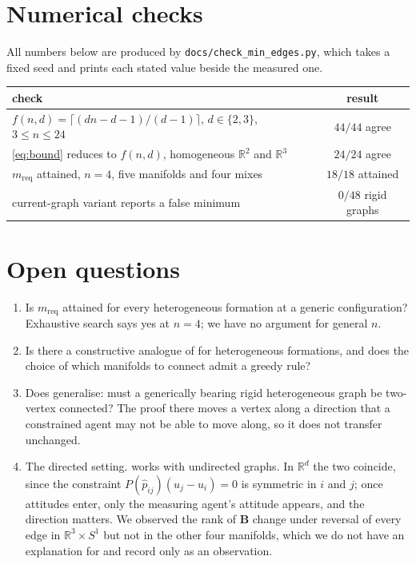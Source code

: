 \documentclass[11pt,a4paper]{article}
\theoremstyle{plain}
\theoremstyle{definition}
\newcommand{\R}{\mathbb{R}}
\begin{document}
\section{Numerical checks}

All numbers below are produced by \texttt{docs/check\_min\_edges.py}, which
takes a fixed seed and prints each stated value beside the measured one.

\begin{center}
\begin{tabular}{lc}
\toprule
check & result\\
\midrule
$f(n,d)=\lceil(dn-d-1)/(d-1)\rceil$, $d\in\{2,3\}$, $3\le n\le24$ & $44/44$ agree\\
\eqref{eq:bound} reduces to $f(n,d)$, homogeneous $\R^2$ and $\R^3$ & $24/24$ agree\\
$m_{\text{req}}$ attained, $n=4$, five manifolds and four mixes & $18/18$ attained\\
current-graph variant reports a false minimum & $0/48$ rigid graphs\\
\bottomrule
\end{tabular}
\end{center}

\section{Open questions}

\begin{enumerate}
\item Is $m_{\text{req}}$ attained for every heterogeneous formation at a
generic configuration? Exhaustive search says yes at $n=4$; we have no argument
for general $n$.
\item Is there a constructive analogue of \cite[Alg.~1]{trinh2020} for
heterogeneous formations, and does the choice of which manifolds to connect
admit a greedy rule?
\item Does \cite[Lem.~4.1]{trinh2020} generalise: must a generically bearing
rigid heterogeneous graph be two-vertex connected? The proof there moves a
vertex along a direction that a constrained agent may not be able to move
along, so it does not transfer unchanged.
\item The directed setting. \cite{trinh2020} works with undirected graphs. In
$\R^d$ the two coincide, since the constraint $P(\hat p_{ij})(u_j-u_i)=0$ is
symmetric in $i$ and $j$; once attitudes enter, only the measuring agent's
attitude appears, and the direction matters. We observed the rank of
$\mathbf B$ change under reversal of every edge in $\R^3\times S^1$ but not in
the other four manifolds, which we do not have an explanation for and record
only as an observation.
\end{enumerate}
\end{document}
